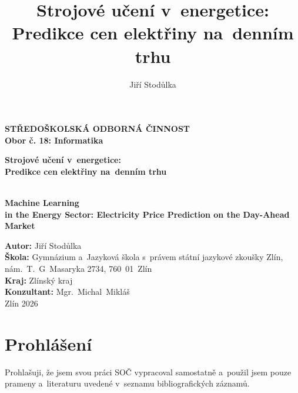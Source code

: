 \documentclass[a4paper]{article}
\title{Strojové učení v~energetice: Predikce cen elektřiny na~denním trhu}
\author{Jiří Stodůlka}
\begin{document}

\begin{titlepage}

    {\centering
    {\large
    \textbf{STŘEDOŠKOLSKÁ ODBORNÁ ČINNOST}\\
    \textbf{Obor č. 18: Informatika}}

    \vspace*{\fill}

    {\Huge \textbf{Strojové učení v~energetice: \\ Predikce cen elektřiny na~denním trhu}\par}
    {\Huge \textbf{\\Machine Learning \\ in the Energy Sector: Electricity Price Prediction on the Day-Ahead Market}\par}
    }
    \vspace*{\fill}
    {\large
    \noindent
    \textbf{Autor:} Jiří Stodůlka\\
    \textbf{Škola:} Gymnázium a~Jazyková škola s~právem státní jazykové zkoušky Zlín, nám.~T.~G~Masaryka 2734, 760~01~Zlín\\
    \textbf{Kraj:} Zlínský kraj\\
    \textbf{Konzultant:} Mgr.~Michal~Mikláš\\[5mm]
    Zlín 2026}

\end{titlepage}
\section*{Prohlášení}
Prohlašuji, že jsem svou práci SOČ vypracoval samostatně a~použil jsem pouze prameny a~literaturu uvedené v~seznamu bibliografických záznamů.
\end{document}
